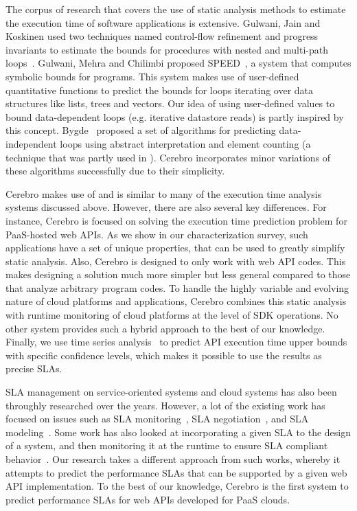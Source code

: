 The corpus of research that covers the use of static analysis methods 
to estimate the execution time of software applications is 
extensive. Gulwani, Jain and Koskinen used two techniques named control-flow
 refinement and progress invariants to estimate the bounds for procedures with nested and multi-path loops~\cite{Gulwani:2009:CRP:1542476.1542518}.
 Gulwani, Mehra and Chilimbi proposed SPEED~\cite{Gulwani:2009:SPE:1480881.1480898}, a system that computes symbolic bounds for programs. This
 system makes use of user-defined quantitative functions to predict the bounds for loops iterating over
data structures like lists, trees and vectors. Our idea of using user-defined values to bound
 data-dependent loops (e.g. iterative datastore reads) is partly inspired by this concept.
 Bygde~\cite{bygde2010static} proposed a set of algorithms for predicting data-independent loops using abstract interpretation
 and element counting (a technique that was partly used in \cite{ermedahl2007loop}). 
Cerebro incorporates minor variations of these algorithms successfully due to their
simplicity.  
 
Cerebro makes use of and is similar to many of the execution time analysis 
systems discussed above.  However, there are also several key differences. 
For instance, Cerebro is focused on solving the
execution time prediction problem for PaaS-hosted web APIs. 
As we show in our characterization survey, such applications 
have a set of unique properties, that can be used to greatly simplify static analysis.
Also, Cerebro is designed to only work with web API codes. This makes designing 
a solution much more simpler but less general compared to those that analyze
arbitrary program codes.
To handle the highly variable and evolving nature of
cloud platforms and applications, Cerebro combines this static analysis with runtime
monitoring of cloud platforms at the level of SDK operations. No other 
system provides such a hybrid approach to the best of our knowledge. 
Finally,
we use time series analysis~\cite{Nurmi:2007:QQB:1791551.1791556} 
to predict API execution time upper bounds with specific confidence
levels, which makes it possible to use the results as precise SLAs.

SLA management on service-oriented systems and cloud systems has also been 
throughly researched
over the years. However, a lot of the existing work has focused on issues 
such as SLA monitoring~\cite{Michlmayr:2009:CQM:1657755.1657756,Tripathy:2011:MMS:1980822.1980832,Raimondi:2008:EOM:1453101.1453125,Bertolino:2007:SUS:1294904.1294914}, SLA negotiation~\cite{Mahbub:2011:PSN:2061042.2062022,Yaqub:2014:ONS:2680847.2681496,6546098}, and SLA modeling~\cite{Chau:2008:ASM:1463788.1463802,Stamou:2013:SGM:2516588.2516592,Skene:2004:PSL:998675.999422}. 
Some work has also looked at incorporating a given SLA to the design of a system, and
then monitoring it at the runtime to ensure SLA compliant behavior~\cite{He:2013:TSC:2532443.2532449}. 
Our research takes a
different approach from such works, whereby it attempts to predict the performance SLAs that can be 
supported by a given web API implementation. To the best of our knowledge, Cerebro is the first system to predict performance SLAs for web APIs developed for PaaS clouds.

